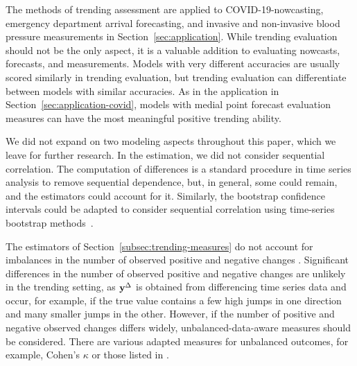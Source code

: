 The methods of trending assessment are applied to COVID-19-nowcasting, emergency department arrival forecasting, and invasive and non-invasive blood pressure measurements in Section~\ref{sec:application}.
While trending evaluation should not be the only aspect, it is a valuable addition to evaluating nowcasts, forecasts, and measurements.
Models with very different accuracies are usually scored similarly in trending evaluation, but trending evaluation can differentiate between models with similar accuracies.
As in the application in Section~\ref{sec:application-covid}, models with medial point forecast evaluation measures can have the most meaningful positive trending ability.

We did not expand on two modeling aspects throughout this paper, which we leave for further research.
In the estimation, we did not consider sequential correlation.
The computation of differences is a standard procedure in time series analysis to remove sequential dependence, but, in general, some could remain, and the estimators could account for it.
Similarly, the bootstrap confidence intervals could be adapted to consider sequential correlation using time-series bootstrap methods~\citep{Hardle2003,Kreiss2012}.

The estimators of Section~\ref{subsec:trending-measures} do not account for imbalances in the number of observed positive and negative changes \citep[for a theoretical analysis, see][Chapter 3]{Jolliffe2012}.
Significant differences in the number of observed positive and negative changes are unlikely in the trending setting, as $\mathbf{y}^{\Delta}$ is obtained from differencing time series data and occur, for example, if the true value contains a few high jumps in one direction and many smaller jumps in the other. 
However, if the number of positive and negative observed changes differs widely, unbalanced-data-aware measures should be considered.
There are various adapted measures for unbalanced outcomes, for example, Cohen's $\kappa$ \citep{Cohen1960} or those listed in \citet[Table 3.3]{Jolliffe2012}.
